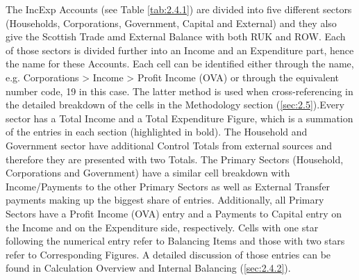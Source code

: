 The IncExp Accounts (see Table \ref{tab:2.4.1}) are divided into five different sectors (Households, Corporations, Government, Capital and External) and they also give the Scottish Trade amd External Balance with both RUK and ROW. Each of those sectors is divided further into an Income and an Expenditure part, hence the name for these Accounts. Each cell can be identified either through the name, e.g. Corporations > Income > Profit Income (OVA) or through the equivalent number code, 19 in this case. The latter method is used when cross-referencing in the detailed breakdown of the cells in the Methodology section (\ref{sec:2.5}).Every sector has a Total Income and a Total Expenditure Figure, which is a summation of the entries in each section (highlighted in bold). The Household and Government sector have additional Control Totals from external sources and therefore they are presented with two Totals. The Primary Sectors (Household, Corporations and Government) have a similar cell breakdown with Income/Payments to the other Primary Sectors as well as External Transfer payments making up the biggest share of entries. Additionally, all Primary Sectors have a Profit Income (OVA) entry and a Payments to Capital entry on the Income and on the Expenditure side, respectively. Cells with one star following the numerical entry refer to Balancing Items and those with two stars refer to Corresponding Figures. A detailed discussion of those entries can be found in Calculation Overview and Internal Balancing (\ref{sec:2.4.2}).




